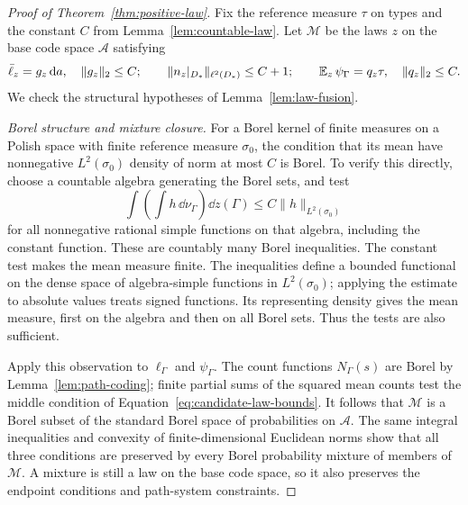 \begin{proof}[Proof of Theorem~\ref{thm:positive-law}]
Fix the reference measure \(\tau\) on types and the constant \(C\) from
Lemma~\ref{lem:countable-law}.  Let \(\mathcal M\) be the laws \(z\) on
the base code space \(\mathscr A\) satisfying
\begin{equation}\label{eq:candidate-law-bounds}
 \bar\ell_z=g_z\,\mathrm d a,\quad \|g_z\|_2\le C;
 \qquad \|n_z|_{D_*}\|_{\ell^2(D_*)}\le C+1;
 \qquad \operatorname{\mathbb E}_z\psi_\Gamma=q_z\tau,\quad \|q_z\|_2\le C.
\end{equation}
We check the structural hypotheses of Lemma~\ref{lem:law-fusion}.

\smallskip\noindent
\emph{Borel structure and mixture closure.}
For a Borel kernel of finite measures on a Polish space with finite reference
measure \(\sigma_0\), the condition that its mean have nonnegative
\(L^2(\sigma_0)\) density of norm at most \(C\) is Borel.  To verify this
directly, choose a countable algebra generating the Borel sets, and test
\[
 \int\!\left(\int h\,\dd\nu_\Gamma\right)\dd z(\Gamma)
 \le C\|h\|_{L^2(\sigma_0)}
\]
for all nonnegative rational simple functions on that algebra, including
the constant function.  These are countably many Borel inequalities.  The
constant test makes the mean measure finite.  The inequalities define a
bounded functional on the dense space of algebra-simple functions in
\(L^2(\sigma_0)\); applying the estimate to absolute values treats signed
functions.  Its representing density gives the mean measure, first on the
algebra and then on all Borel sets.  Thus the tests are also sufficient.

Apply this observation to \(\ell_\Gamma\) and \(\psi_\Gamma\).
The count functions \(N_\Gamma(s)\) are Borel by
Lemma~\ref{lem:path-coding}; finite partial sums of the squared mean counts
test the middle condition of Equation~\eqref{eq:candidate-law-bounds}.
It follows that \(\mathcal M\) is a Borel subset of the standard Borel
space of probabilities on \(\mathscr A\).  The same integral inequalities
and convexity of finite-dimensional Euclidean norms show that all three
conditions are preserved by every Borel probability mixture of members of
\(\mathcal M\).  A mixture is still a law on the base code space, so it
also preserves the endpoint conditions and path-system constraints.


\end{proof}
